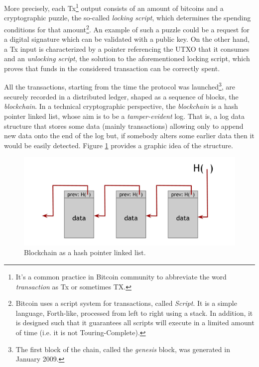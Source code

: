 \bigskip
\noindent
More precisely, each Tx\footnote{It's a common practice in Bitcoin community to abbreviate the word \textit{transaction} as Tx or sometimes TX.} output consists of an amount of bitcoins and a cryptographic puzzle, the so-called \textit{locking script}, which determines the spending conditions for that amount\footnote{Bitcoin uses a script system for transactions, called \textit{Script}. It is a simple language, Forth-like, processed from left to right using a stack. In addition, it is designed such that it guarantees all scripts will execute in a limited amount of time (i.e. it is not Touring-Complete).}. An example of such a puzzle could be a request for a digital signature which can be validated with a public key. On the other hand, a Tx input is characterized by a pointer referencing the UTXO that it consumes and an \textit{unlocking script}, the solution to the aforementioned locking script, which proves that funds in the considered transaction can be correctly spent.

\bigskip
\noindent
All the transactions, starting from the time the protocol was launched\footnote{The first block of the chain, called the \textit{genesis} block, was generated in January 2009.}, are securely recorded in a distributed ledger, shaped as a sequence of blocks, the \textit{blockchain}. In a technical cryptographic perspective, the \textit{blockchain} is a hash pointer linked list, whose aim is to be a \textit{tamper-evident} log. That is, a log data structure that stores some data (mainly transactions) allowing only to append new data onto the end of the log but, if somebody alters some earlier data then it would be easily detected. Figure \ref{fig:blockchain} provides a graphic idea of the structure.

\begin{figure}[!htbp]
    \centering
    \includegraphics[width=0.9\linewidth]{Images/blockchain.png}
    \caption{Blockchain as a hash pointer linked list.}
    \label{fig:blockchain}
\end{figure}

